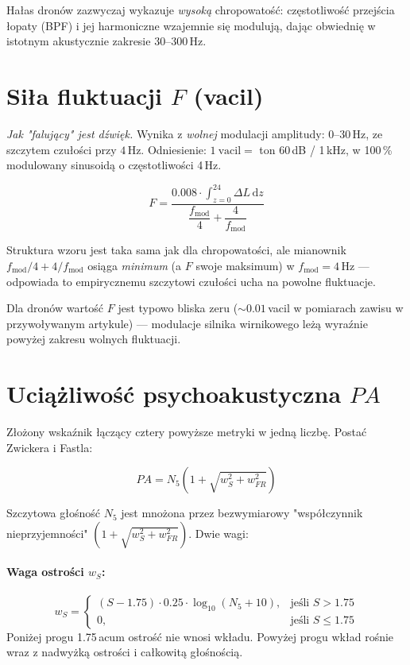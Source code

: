 \documentclass[11pt,a4paper]{article}
\begin{document}
\noindent
Hałas dronów zazwyczaj wykazuje \emph{wysoką} chropowatość: częstotliwość
przejścia łopaty (BPF) i jej harmoniczne wzajemnie się modulują, dając
obwiednię w istotnym akustycznie zakresie 30--300\,Hz.

\section{Siła fluktuacji \texorpdfstring{$F$}{F} (vacil)}

\textit{Jak "falujący" jest dźwięk.} Wynika z \emph{wolnej} modulacji
amplitudy: $0$--$30$\,Hz, ze szczytem czułości przy $4$\,Hz. Odniesienie:
$1\ \text{vacil} = $ ton 60\,dB / 1\,kHz, w 100\,\% modulowany sinusoidą
o częstotliwości 4\,Hz.

\[
  F = \frac{0.008 \cdot \displaystyle\int_{z=0}^{24} \Delta L\, \mathrm{d}z}{\dfrac{f_{\text{mod}}}{4} + \dfrac{4}{f_{\text{mod}}}}
\]

\noindent
Struktura wzoru jest taka sama jak dla chropowatości, ale mianownik
$f_{\text{mod}}/4 + 4/f_{\text{mod}}$ osiąga \emph{minimum} (a $F$ swoje
maksimum) w $f_{\text{mod}} = 4$\,Hz --- odpowiada to empirycznemu szczytowi
czułości ucha na powolne fluktuacje.

Dla dronów wartość $F$ jest typowo bliska zeru ($\sim 0.01$\,vacil w pomiarach
zawisu w przywoływanym artykule) --- modulacje silnika wirnikowego leżą wyraźnie
powyżej zakresu wolnych fluktuacji.

\section{Uciążliwość psychoakustyczna \texorpdfstring{$PA$}{PA}}

Złożony wskaźnik łączący cztery powyższe metryki w jedną liczbę. Postać
Zwickera i Fastla:

\begin{paformula}
\[
  PA = N_5 \left(1 + \sqrt{w_S^2 + w_{FR}^2}\right)
\]
\end{paformula}

\noindent
Szczytowa głośność $N_5$ jest mnożona przez bezwymiarowy "współczynnik
nieprzyjemności" $(1 + \sqrt{w_S^2 + w_{FR}^2})$. Dwie wagi:

\paragraph{Waga ostrości \boldmath$w_S$:}
\[
  w_S =
  \begin{cases}
    (S - 1.75) \cdot 0.25 \cdot \log_{10}(N_5 + 10), & \text{jeśli } S > 1.75 \\
    0, & \text{jeśli } S \le 1.75
  \end{cases}
\]
Poniżej progu 1.75\,acum ostrość nie wnosi wkładu. Powyżej progu wkład rośnie
wraz z nadwyżką ostrości i całkowitą głośnością.
\end{document}
